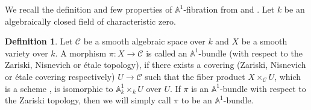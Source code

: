 \documentclass[11pt, reqno]{amsart}
\theoremstyle{plain}
\theoremstyle{definition}
\newtheorem{definition}[thm]{Definition}
\newcommand{\sC}{{\mathcal C}}
\newcommand{\A}{{\mathbb A}}
\begin{document}
 We recall the definition and few properties of $\mathbb{A}^1$-fibration from \cite[Chapter 2]{masuda} and \cite[Chapter 3]{miyanishicrm}. Let 
$k$ be an algebraically closed field of characteristic zero.
	\begin{definition} \label{bundle}
 Let $\mathcal{C}$ be a smooth algebraic space over $k$ and $X$ be a smooth variety over $k$. A morphism $\pi: X \to \sC$ is called an $\A^1$-bundle (with respect to the Zariski, Nisnevich or \'etale topology),
        if there exists a covering (Zariski, Nisnevich or \'etale covering respectively)
        $U \to \sC$ such that the fiber product $X \times_\sC U$, 
        which is a scheme 
       \cite[Corollary 4.2.3]{alpher},
        is isomorphic to $\A^1_k \times_k U$ over $U$. If $\pi$ is an $\mathbb{A}^1$-bundle with respect to the Zariski topology, then we will simply call $\pi$ to be an $\mathbb{A}^1$-bundle.
	\end{definition}
\end{document}
